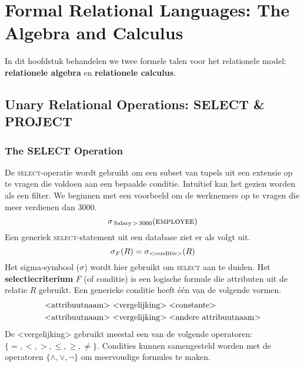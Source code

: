 \chapter{Formal Relational Languages: The Algebra and Calculus}
In dit hoofdstuk behandelen we twee formele talen voor het relationele model: \textbf{relationele algebra} en \textbf{relationele calculus}.

\section{Unary Relational Operations: SELECT \& PROJECT}
\subsection{The SELECT Operation}
De \textsc{select}-operatie wordt gebruikt om een subset van tupels uit een extensie op te vragen die voldoen aan een bepaalde conditie. Intu\"itief kan het gezien worden als een filter. We beginnen met een voorbeeld om de werknemers op te vragen die meer verdienen dan 3000.
\vspace{-2mm}
\[ \sigma_{\,\text{Salary}\,>\,3000}(\textsc{employee}) \]
Een generiek \textsc{select}-statement uit een database ziet er als volgt uit.
\vspace{-2mm}
\[ \sigma_F(R) = \sigma_\text{{\textless}conditie{\textgreater}}(R) \]
Het sigma-symbool ($\sigma$) wordt hier gebruikt om \textsc{select} aan te duiden. Het \textbf{selectiecriterium} $F$ (of conditie) is een logische formule die attributen uit de relatie $R$ gebruikt. Een generieke conditie heeft \'e\'en van de volgende vormen.
\vspace{-2mm}
\begin{align*}
&\text{{\textless}attribuutnaam{\textgreater} {\textless}vergelijking{\textgreater} {\textless}constante{\textgreater}} \\
&\text{{\textless}attribuutnaam{\textgreater} {\textless}vergelijking{\textgreater} {\textless}andere attribuutnaam{\textgreater}}
\end{align*}
De {\textless}vergelijking{\textgreater} gebruikt meestal een van de volgende operatoren: $\{=, <, >, \leqslant, \geqslant, \neq \}$. Condities kunnen samengesteld worden met de operatoren $\{\wedge, \vee, \neg\}$ om meervoudige formules te maken.



